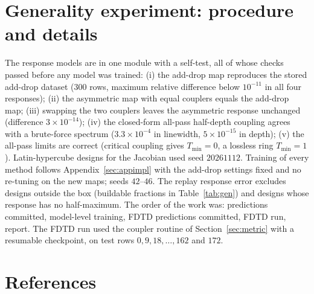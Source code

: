 \documentclass[11pt]{article}
\begin{document}
\section{Generality experiment: procedure and details}
\label{sec:appgen}

The response models are in one module with a self-test, all of whose checks passed before any model was trained: (i) the add-drop map reproduces the stored add-drop dataset ($300$ rows, maximum relative difference below $10^{-11}$ in all four responses); (ii) the asymmetric map with equal couplers equals the add-drop map; (iii) swapping the two couplers leaves the asymmetric response unchanged (difference $3\times10^{-14}$); (iv) the closed-form all-pass half-depth coupling agrees with a brute-force spectrum ($3.3\times10^{-4}$ in linewidth, $5\times10^{-15}$ in depth); (v) the all-pass limits are correct (critical coupling gives $T_{\min}=0$, a lossless ring $T_{\min}=1$). Latin-hypercube designs for the Jacobian used seed $20261112$. Training of every method follows Appendix~\ref{sec:appimpl} with the add-drop settings fixed and no re-tuning on the new maps; seeds $42$--$46$. The replay response error excludes designs outside the box (buildable fractions in Table~\ref{tab:gen}) and designs whose response has no half-maximum. The order of the work was: predictions committed, model-level training, FDTD predictions committed, FDTD run, report. The FDTD run used the coupler routine of Section~\ref{sec:metric} with a resumable checkpoint, on test rows $0, 9, 18, \dots, 162$ and $172$.

\section*{References}
\end{document}
